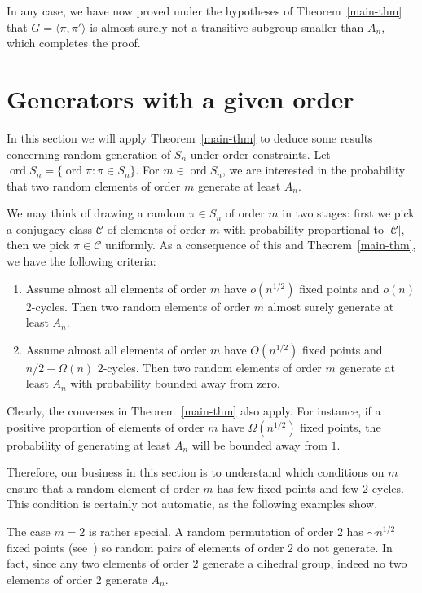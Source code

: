\documentclass[ALCO,ThmDefs,Unicode,epreuves]{cedram}
\DeclareMathOperator{\ord}{ord}
\newcommand\calC{\mathcal{C}}
\newcommand\ordn{\ord S_n}
\begin{document}
In any case, we have now proved under the hypotheses of Theorem~\ref{main-thm} that $G = \langle \pi, \pi'\rangle$ is almost surely not a transitive subgroup smaller than $A_n$, which completes the proof.

\section{Generators with a given order}\label{sec:fixed-order}
In this section we will apply Theorem~\ref{main-thm} to deduce some results concerning random generation of $S_n$ under order constraints. Let $\ordn=\{\ord \pi : \pi \in S_n\}$. For $m \in \ordn$, we are interested in the probability that two random elements of order $m$ generate at least $A_n$.

We may think of drawing a random $\pi\in S_n$ of order $m$ in two stages: first we pick a conjugacy class $\calC$ of elements of order $m$ with probability proportional to $|\calC|$, then we pick $\pi \in \calC$ uniformly. As a consequence of this and Theorem~\ref{main-thm}, we have the following criteria:

\begin{enumerate}
\item\label{sect5_1} Assume almost all elements of order $m$ have $o(n^{1/2})$ fixed points and $o(n)$ $2$-cycles. Then two random elements of order $m$ almost surely generate at least $A_n$.
\item\label{sect5_2} Assume almost all elements of order $m$ have $O(n^{1/2})$ fixed points and ${n/2-\Omega(n)}$ $2$-cycles. Then two random elements of order $m$ generate at least $A_n$ with probability bounded away from zero.
\end{enumerate}
Clearly, the converses in Theorem~\ref{main-thm} also apply. For instance, if a positive proportion of elements of order $m$ have $\Omega(n^{1/2})$ fixed points, the probability of generating at least $A_n$ will be bounded away from $1$.

Therefore, our business in this section is to understand which conditions on $m$ ensure that a random element of order $m$ has few fixed points and few $2$-cycles. This condition is certainly not automatic, as the following examples show.

\begin{exam}
 The case $m = 2$ is rather special. A random permutation of order $2$ has $\sim n^{1/2}$ fixed points (see~\cite[Proposition~IX.19]{flajolet-sedgewick}) so random pairs of elements of order $2$ do not generate. In fact, since any two elements of order $2$ generate a dihedral group, indeed no two elements of order $2$ generate $A_n$.
\end{exam}
\end{document}
